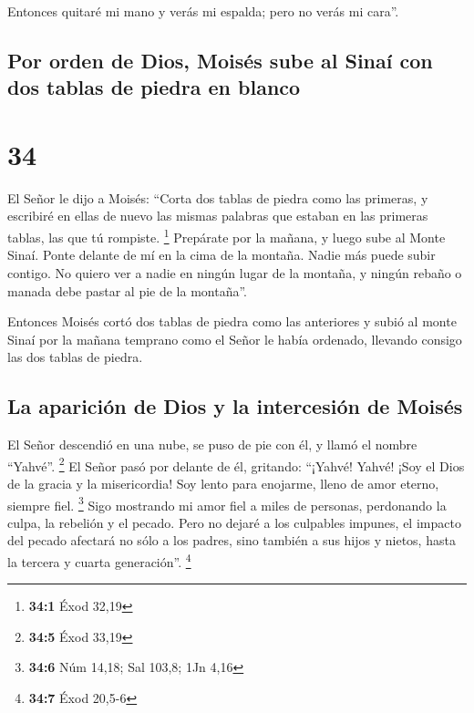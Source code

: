  Entonces quitaré mi mano y verás mi espalda; pero no
verás mi cara''.

\hypertarget{por-orden-de-dios-moisuxe9s-sube-al-sinauxed-con-dos-tablas-de-piedra-en-blanco}{%
\subsection{Por orden de Dios, Moisés sube al Sinaí con dos tablas de
piedra en
blanco}\label{por-orden-de-dios-moisuxe9s-sube-al-sinauxed-con-dos-tablas-de-piedra-en-blanco}}

\hypertarget{section-33}{%
\section{34}\label{section-33}}

 El Señor le dijo a Moisés: ``Corta dos tablas de piedra
como las primeras, y escribiré en ellas de nuevo las mismas palabras que
estaban en las primeras tablas, las que tú rompiste. \footnote{\textbf{34:1}
  Éxod 32,19}  Prepárate por la mañana, y luego sube al
Monte Sinaí. Ponte delante de mí en la cima de la montaña.
 Nadie más puede subir contigo. No quiero ver a nadie en
ningún lugar de la montaña, y ningún rebaño o manada debe pastar al pie
de la montaña''.

 Entonces Moisés cortó dos tablas de piedra como las
anteriores y subió al monte Sinaí por la mañana temprano como el Señor
le había ordenado, llevando consigo las dos tablas de piedra.

\hypertarget{la-apariciuxf3n-de-dios-y-la-intercesiuxf3n-de-moisuxe9s}{%
\subsection{La aparición de Dios y la intercesión de
Moisés}\label{la-apariciuxf3n-de-dios-y-la-intercesiuxf3n-de-moisuxe9s}}

 El Señor descendió en una nube, se puso de pie con él, y
llamó el nombre ``Yahvé''. \footnote{\textbf{34:5} Éxod 33,19}
 El Señor pasó por delante de él, gritando: ``¡Yahvé!
Yahvé! ¡Soy el Dios de la gracia y la misericordia! Soy lento para
enojarme, lleno de amor eterno, siempre fiel. \footnote{\textbf{34:6}
  Núm 14,18; Sal 103,8; 1Jn 4,16}  Sigo mostrando mi amor
fiel a miles de personas, perdonando la culpa, la rebelión y el pecado.
Pero no dejaré a los culpables impunes, el impacto del pecado afectará
no sólo a los padres, sino también a sus hijos y nietos, hasta la
tercera y cuarta generación''. \footnote{\textbf{34:7} Éxod 20,5-6}

